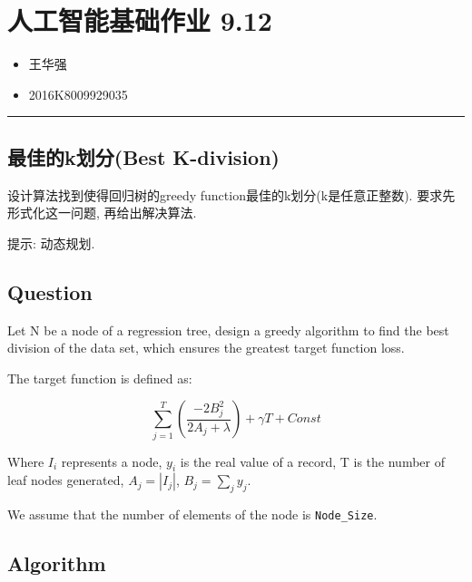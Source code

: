 \documentclass[]{article}
\date{}
\providecommand{\tightlist}{%
  \setlength{\itemsep}{0pt}\setlength{\parskip}{0pt}}
\begin{document}
\hypertarget{ux4ebaux5de5ux667aux80fdux57faux7840ux4f5cux4e1a-9.12}{%
\section{人工智能基础作业
9.12}\label{ux4ebaux5de5ux667aux80fdux57faux7840ux4f5cux4e1a-9.12}}

\begin{itemize}
\tightlist
\item
  王华强
\item
  2016K8009929035
\end{itemize}

\begin{center}\rule{0.5\linewidth}{\linethickness}\end{center}

\hypertarget{ux6700ux4f73ux7684kux5212ux5206best-k-division}{%
\subsection{最佳的k划分(Best
K-division)}\label{ux6700ux4f73ux7684kux5212ux5206best-k-division}}

设计算法找到使得回归树的greedy function最佳的k划分(k是任意正整数).
要求先形式化这一问题, 再给出解决算法.

提示: 动态规划.

\hypertarget{question}{%
\subsection{Question}\label{question}}

Let N be a node of a regression tree, design a greedy algorithm to find
the best division of the data set, which ensures the greatest target
function loss.

The target function is defined as:

\[\sum_{j=1}^{T}(\frac{-2B_j^2}{2A_j+\lambda})+\gamma T+Const\]

Where \(I_i\) represents a node, \(y_i\) is the real value of a record,
T is the number of leaf nodes generated, \(A_j=|I_j|\),
\(B_j=\sum_{j}y_j\).

We assume that the number of elements of the node is
\texttt{Node\_Size}.

\hypertarget{algorithm}{%
\subsection{Algorithm}\label{algorithm}}
\end{document}
